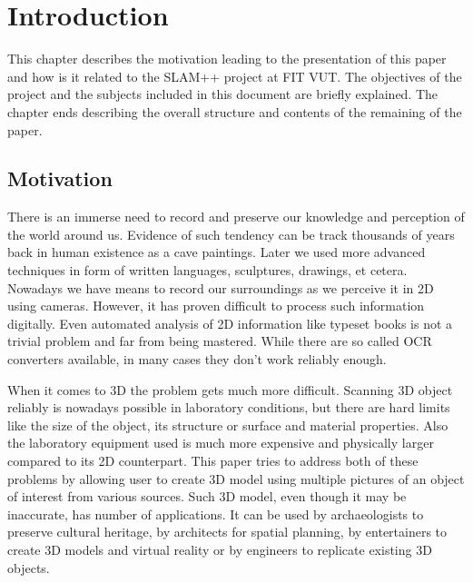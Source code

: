 
\chapter{Introduction}
This chapter describes the motivation leading to the presentation of this paper and how is it related to the SLAM++ project at FIT VUT. The objectives of the project and the subjects included in this document are briefly explained. The chapter ends describing the overall structure and contents of the remaining of the paper.

\section{Motivation}
There is an immerse need to record and preserve our knowledge and perception of the world around us. Evidence of such tendency can be track thousands of years back in human existence as a cave paintings. Later we used more advanced techniques in form of written languages, sculptures, drawings, et cetera. Nowadays we have means to record our surroundings as we perceive it in 2D using cameras. However, it has proven difficult to process such information digitally. Even automated analysis of 2D information like typeset books is not a trivial problem and far from being mastered. While there are so called OCR converters available, in many cases they don't work reliably enough.

When it comes to 3D the problem gets much more difficult. Scanning 3D object reliably is nowadays possible in laboratory conditions, but there are hard limits like the size of the object, its structure or surface and material properties. Also the laboratory equipment used is much more expensive and physically larger compared to its 2D counterpart. This paper tries to address both of these problems by allowing user to create 3D model using multiple pictures of an object of interest from various sources. Such 3D model, even though it may be inaccurate, has number of applications. It can be used by archaeologists to preserve cultural heritage, by architects for spatial planning, by entertainers to create 3D models and virtual reality or by engineers to replicate existing 3D objects.

